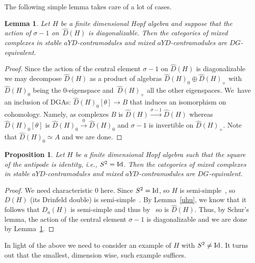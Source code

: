 \documentclass[10pt,a4paper]{amsart}
\numberwithin{equation}{section}
\newtheorem{Lemma}[Theorem]{Lemma}
\newtheorem{Proposition}[Theorem]{Proposition}
\begin{document}
The following simple lemma takes care of a lot of cases.

\begin{Lemma}\label{diag}
Let $H$ be a finite dimensional Hopf algebra and suppose that the action of $\sigma-1$ on~$\widehat{D}(H)$ is diagonalizable. Then the categories of mixed complexes in stable $aYD$-contramodules and mixed $aYD$-contramodules are $DG$-equivalent.
\end{Lemma}

\begin{proof}
Since the action of the central element $\sigma-1$ on $\widehat{D}(H)$ is diagonalizable we may decom\-pose $\widehat{D}(H)$ as a product of algebras $\widehat{D}(H)_0\oplus \widehat{D}(H)_+$ with $\widehat{D}(H)_0$ being the $0$-eigenspace and~$\widehat{D}(H)_+$ all the other eigenspaces. We~have an inclusion of DGAs: $\widehat{D}(H)_0[\theta]\to B$ that induces an isomorphism on cohomology. Namely, as complexes $B$ is $\widehat{D}(H)\stackrel{\sigma-1}{\to}\widehat{D}(H)$ whereas $\widehat{D}(H)_0[\theta]$ is $\widehat{D}(H)_0\stackrel{0}{\to}\widehat{D}(H)_0$ and $\sigma-1$ is invertible on $\widehat{D}(H)_+$. Note that $\widehat{D}(H)_0\simeq A$ and we are done.
\end{proof}

\begin{Proposition}\label{sscase}
Let $H$ be a finite dimensional Hopf algebra such that the square of the antipode is identity, i.e., $S^2={\rm Id}$. Then the categories of mixed complexes in stable $aYD$-contramodules and mixed $aYD$-contramodules are $DG$-equivalent.
\end{Proposition}

\begin{proof}We need characteristic $0$ here. Since $S^2={\rm Id}$, so $H$ is semi-simple~\cite{sqid2, sqid}, so $D(H)$ (its Drinfeld double) is semi-simple~\cite{dhss}. By Lemma~\ref{uhu}, we know that it follows that $D_a(H)$ is semi-simple and thus by~\cite{s2} so is $\widehat{D}(H)$. Thus, by Schur's lemma, the action of the central element $\sigma-1$ is diagonalizable and we are done by Lemma~\ref{diag}.
\end{proof}

In light of the above we need to consider an example of $H$ with $S^2\neq {\rm Id}$. It turns out that the smallest, dimension wise, such example suffices.
\end{document}
